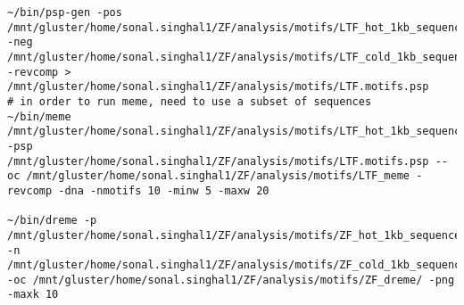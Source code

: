 \documentclass[idxtotoc,hyperref,openany,oneside]{labbook} %
\begin{document}
\begin{verbatim}
~/bin/psp-gen -pos /mnt/gluster/home/sonal.singhal1/ZF/analysis/motifs/LTF_hot_1kb_sequences.subset.fa -neg /mnt/gluster/home/sonal.singhal1/ZF/analysis/motifs/LTF_cold_1kb_sequences.subset.fa -revcomp > /mnt/gluster/home/sonal.singhal1/ZF/analysis/motifs/LTF.motifs.psp
# in order to run meme, need to use a subset of sequences
~/bin/meme /mnt/gluster/home/sonal.singhal1/ZF/analysis/motifs/LTF_hot_1kb_sequences.subset.fa -psp /mnt/gluster/home/sonal.singhal1/ZF/analysis/motifs/LTF.motifs.psp --oc /mnt/gluster/home/sonal.singhal1/ZF/analysis/motifs/LTF_meme -revcomp -dna -nmotifs 10 -minw 5 -maxw 20

~/bin/dreme -p /mnt/gluster/home/sonal.singhal1/ZF/analysis/motifs/ZF_hot_1kb_sequences.fa -n /mnt/gluster/home/sonal.singhal1/ZF/analysis/motifs/ZF_cold_1kb_sequences.fa -oc /mnt/gluster/home/sonal.singhal1/ZF/analysis/motifs/ZF_dreme/ -png -maxk 10
\end{verbatim}
\end{document}
